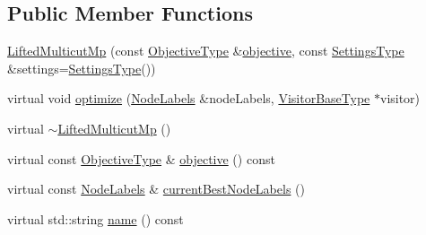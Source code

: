 \subsection*{Public Member Functions}
\begin{DoxyCompactItemize}
\item 
\hyperlink{classnifty_1_1graph_1_1optimization_1_1lifted__multicut_1_1LiftedMulticutMp_ac8d26aad0539ca2a95cfcf01155ad671}{Lifted\+Multicut\+Mp} (const \hyperlink{classnifty_1_1graph_1_1optimization_1_1lifted__multicut_1_1LiftedMulticutMp_a29357bbcb251434565fb393ce3b5d6d0}{Objective\+Type} \&\hyperlink{classnifty_1_1graph_1_1optimization_1_1lifted__multicut_1_1LiftedMulticutMp_a7da246dde18bbd209a3f05421887eeeb}{objective}, const \hyperlink{structnifty_1_1graph_1_1optimization_1_1lifted__multicut_1_1LiftedMulticutMp_1_1SettingsType}{Settings\+Type} \&settings=\hyperlink{structnifty_1_1graph_1_1optimization_1_1lifted__multicut_1_1LiftedMulticutMp_1_1SettingsType}{Settings\+Type}())
\item 
virtual void \hyperlink{classnifty_1_1graph_1_1optimization_1_1lifted__multicut_1_1LiftedMulticutMp_aada7f2dfeae400cfb35925dbcdebbb02}{optimize} (\hyperlink{classnifty_1_1graph_1_1optimization_1_1lifted__multicut_1_1LiftedMulticutMp_a4b0695b3277f6b10aed84ce6e121052a}{Node\+Labels} \&node\+Labels, \hyperlink{classnifty_1_1graph_1_1optimization_1_1lifted__multicut_1_1LiftedMulticutMp_af0ec21b5408072a6fee250667b28e7a8}{Visitor\+Base\+Type} $\ast$visitor)
\item 
virtual \hyperlink{classnifty_1_1graph_1_1optimization_1_1lifted__multicut_1_1LiftedMulticutMp_ad28610e6fe0eac95acea802e95702e74}{$\sim$\+Lifted\+Multicut\+Mp} ()
\item 
virtual const \hyperlink{classnifty_1_1graph_1_1optimization_1_1lifted__multicut_1_1LiftedMulticutMp_a29357bbcb251434565fb393ce3b5d6d0}{Objective\+Type} \& \hyperlink{classnifty_1_1graph_1_1optimization_1_1lifted__multicut_1_1LiftedMulticutMp_a7da246dde18bbd209a3f05421887eeeb}{objective} () const 
\item 
virtual const \hyperlink{classnifty_1_1graph_1_1optimization_1_1lifted__multicut_1_1LiftedMulticutMp_a4b0695b3277f6b10aed84ce6e121052a}{Node\+Labels} \& \hyperlink{classnifty_1_1graph_1_1optimization_1_1lifted__multicut_1_1LiftedMulticutMp_a5c86e964d49dba62cf374e239b39faa2}{current\+Best\+Node\+Labels} ()
\item 
virtual std\+::string \hyperlink{classnifty_1_1graph_1_1optimization_1_1lifted__multicut_1_1LiftedMulticutMp_a939294d3b9892d38419572eeaa20d9c9}{name} () const 
\end{DoxyCompactItemize}


